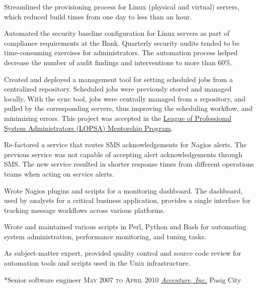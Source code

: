 \documentclass[10pt, a4paper, final]{article}
\begin{document}
\begin{section}
\begin{subsection}
\begin{compactitem}
      \item Streamlined the provisioning process for Linux (physical and virtual) servers, which reduced build times from one day to less than an hour.
      \item Automated the security baseline configuration for Linux servers as part of compliance requirements at the Bank. Quarterly security audits tended to be time-consuming exercises for administrators. The automation process helped decrease the number of audit findings and interventions to more than 60\%.
      \item Created and deployed a management tool for setting scheduled jobs from a centralized repository. Scheduled jobs were previously stored and managed locally. With the sync tool, jobs were centrally managed from a repository, and pulled by the corresponding servers, thus improving the scheduling workflow, and minimizing errors. This project was accepted in the \href{https://lopsa.org/mentor}{League of Professional System Administrators (LOPSA) Mentorship Program}.
      \item Re-factored a service that routes SMS acknowledgements for Nagios alerts. The previous service was not capable of accepting alert acknowledgements through SMS. The new service resulted in shorter response times from different operations teams when acting on service alerts.
      \item Wrote Nagios plugins and scripts for a monitoring dashboard. The dashboard, used by analysts for a critical business application, provides a single interface for tracking message workflows across various platforms.
      \item Wrote and maintained various scripts in Perl, Python and Bash for automating system administration, performance monitoring, and tuning tasks.
      \item As subject-matter expert, provided quality control and source code review for automation tools and scripts used in the Unix infrastructure.
      
    \end{compactitem}
  \end{subsection}
  \vspace{2.5em}

  \begin{subsection}*{Senior software engineer \hfill\textsc{May 2007 to April 2010}}
    \href{http://www.accenture.com}{\textit{Accenture, Inc.}} \hfill Pasig City
    \vspace{1em}


\end{subsection}
\end{section}
\end{document}
